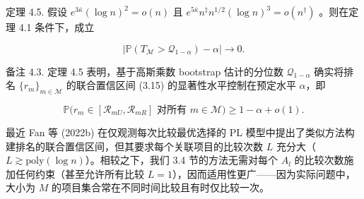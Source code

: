 定理 4.5. 假设 $e^{3\bar{\kappa}}(\log n)^2 = o(n)$ 且 $e^{5\bar{\kappa}}n^{\ddagger}n^{1 / 2}(\log n)^3 = o(n^{\dagger})$ 。则在定理 4.1 条件下，成立

$$
|\mathbb{P}(T_{\mathcal{M}} > \mathcal{Q}_{1 - \alpha}) - \alpha |\to 0.
$$

备注 4.3. 定理 4.5 表明，基于高斯乘数 bootstrap 估计的分位数 $\mathcal{Q}_{1 - \alpha}$ 确实将排名 $\{r_m\}_{m\in \mathcal{M}}$ 的联合置信区间 (3.15) 的显著性水平控制在预定水平 $\alpha$，即

$$
\mathbb{P}\Big(r_{m}\in [\mathcal{R}_{mU},\mathcal{R}_{mR}]\text{ 对所有 }m\in \mathcal{M}\Big)\geq 1 - \alpha +o(1).
$$

最近 Fan 等 (2022b) 在仅观测每次比较最优选择的 PL 模型中提出了类似方法构建排名的联合置信区间，但其要求每个关联项目的比较次数 $L$ 充分大（$L\gtrsim \mathrm{poly}(\log n)$）。相较之下，我们 3.4 节的方法无需对每个 $A_{l}$ 的比较次数施加任何约束（甚至允许所有比较 $L=1$），因而适用性更广——因为实际问题中，大小为 $M$ 的项目集合常在不同时间比较且有时仅比较一次。




